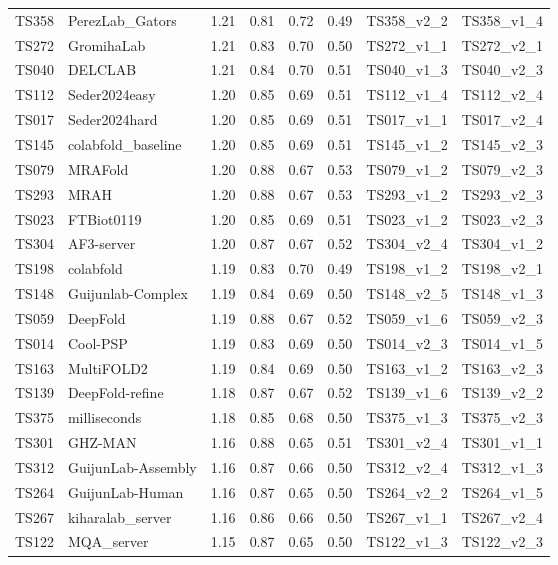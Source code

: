\begin{longtable}{llllllll}
TS358 & PerezLab\_Gators & 1.21 & 0.81 & 0.72 & 0.49 & TS358\_v2\_2 & TS358\_v1\_4 \\ 
TS272 & GromihaLab & 1.21 & 0.83 & 0.70 & 0.50 & TS272\_v1\_1 & TS272\_v2\_1 \\ 
TS040 & DELCLAB & 1.21 & 0.84 & 0.70 & 0.51 & TS040\_v1\_3 & TS040\_v2\_3 \\ 
TS112 & Seder2024easy & 1.20 & 0.85 & 0.69 & 0.51 & TS112\_v1\_4 & TS112\_v2\_4 \\ 
TS017 & Seder2024hard & 1.20 & 0.85 & 0.69 & 0.51 & TS017\_v1\_1 & TS017\_v2\_4 \\ 
TS145 & colabfold\_baseline & 1.20 & 0.85 & 0.69 & 0.51 & TS145\_v1\_2 & TS145\_v2\_3 \\ 
TS079 & MRAFold & 1.20 & 0.88 & 0.67 & 0.53 & TS079\_v1\_2 & TS079\_v2\_3 \\ 
TS293 & MRAH & 1.20 & 0.88 & 0.67 & 0.53 & TS293\_v1\_2 & TS293\_v2\_3 \\ 
TS023 & FTBiot0119 & 1.20 & 0.85 & 0.69 & 0.51 & TS023\_v1\_2 & TS023\_v2\_3 \\ 
TS304 & AF3-server & 1.20 & 0.87 & 0.67 & 0.52 & TS304\_v2\_4 & TS304\_v1\_2 \\ 
TS198 & colabfold & 1.19 & 0.83 & 0.70 & 0.49 & TS198\_v1\_2 & TS198\_v2\_1 \\ 
TS148 & Guijunlab-Complex & 1.19 & 0.84 & 0.69 & 0.50 & TS148\_v2\_5 & TS148\_v1\_3 \\ 
TS059 & DeepFold & 1.19 & 0.88 & 0.67 & 0.52 & TS059\_v1\_6 & TS059\_v2\_3 \\ 
TS014 & Cool-PSP & 1.19 & 0.83 & 0.69 & 0.50 & TS014\_v2\_3 & TS014\_v1\_5 \\ 
TS163 & MultiFOLD2 & 1.19 & 0.84 & 0.69 & 0.50 & TS163\_v1\_2 & TS163\_v2\_3 \\ 
TS139 & DeepFold-refine & 1.18 & 0.87 & 0.67 & 0.52 & TS139\_v1\_6 & TS139\_v2\_2 \\ 
TS375 & milliseconds & 1.18 & 0.85 & 0.68 & 0.50 & TS375\_v1\_3 & TS375\_v2\_3 \\ 
TS301 & GHZ-MAN & 1.16 & 0.88 & 0.65 & 0.51 & TS301\_v2\_4 & TS301\_v1\_1 \\ 
TS312 & GuijunLab-Assembly & 1.16 & 0.87 & 0.66 & 0.50 & TS312\_v2\_4 & TS312\_v1\_3 \\ 
TS264 & GuijunLab-Human & 1.16 & 0.87 & 0.65 & 0.50 & TS264\_v2\_2 & TS264\_v1\_5 \\ 
TS267 & kiharalab\_server & 1.16 & 0.86 & 0.66 & 0.50 & TS267\_v1\_1 & TS267\_v2\_4 \\ 
TS122 & MQA\_server & 1.15 & 0.87 & 0.65 & 0.50 & TS122\_v1\_3 & TS122\_v2\_3 \\ 

\end{longtable}
